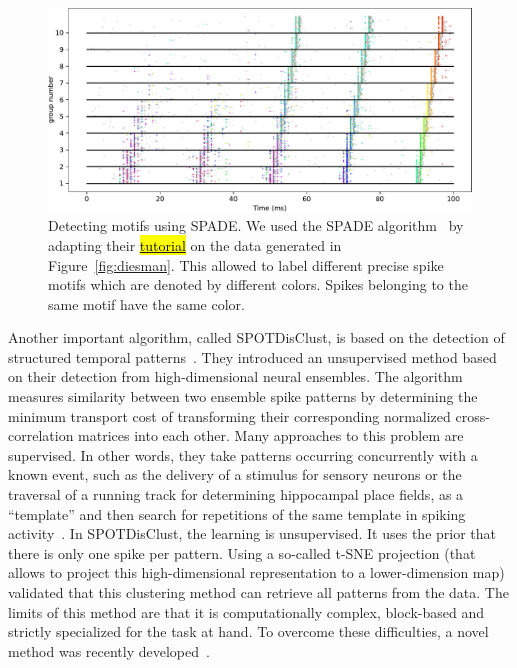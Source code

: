 \documentclass[brainsci, %
               review,accept,pdftex,moreauthors
               ]{Definitions/mdpi}
\begin{document}
\begin{figure}[H]
\includegraphics[width=\linewidth]{figures/Diesmann_et_al_1999_spade.pdf}
\caption{
  Detecting motifs using SPADE. 
  We used the SPADE algorithm~\citep{stella_3d-spade_2019} by adapting their \href{https://elephant.readthedocs.io/en/latest/tutorials/spade.html}{\hl{tutorial}} on the data generated in  Figure~\ref{fig:diesman}. This allowed to label different precise spike motifs which are denoted by different colors. Spikes belonging to the same motif have the same color. %
}\label{fig:Diesmann_et_al_1999_spade}
\end{figure}

Another important algorithm, called SPOTDisClust, is based on the detection of structured temporal patterns~\citep{grossberger_unsupervised_2018}. They introduced an unsupervised method based on their detection from high-dimensional neural ensembles. The algorithm measures similarity between two ensemble spike patterns by determining the minimum transport cost of transforming their corresponding normalized cross-correlation matrices into each other. Many approaches to this problem are supervised. In other words, they take patterns occurring concurrently with a known event, such as the delivery of a stimulus for sensory neurons or the traversal of a running track for determining hippocampal place fields, as a ``template'' and then search for repetitions of the same template in spiking activity~\citep{nadasdy_replay_1999,lee_combinatorial_2004}. In SPOTDisClust, the learning is unsupervised. It uses the prior that there is only one spike per pattern. Using a so-called t-SNE projection (that allows to project this high-dimensional representation to a lower-dimension map) validated that this clustering method can retrieve all patterns from the data. %
The limits of this method are that it is computationally complex, block-based and strictly specialized for the task at hand. To overcome these difficulties, a novel method was recently developed~\citep{sotomayor-gomez_spikeship_2021}.
\end{document}
